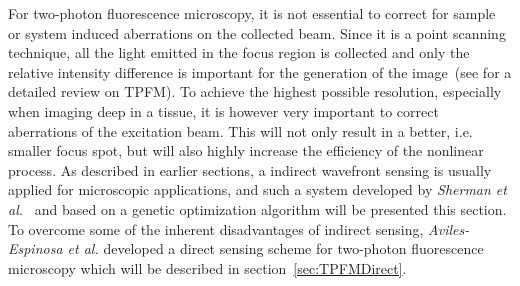 For two-photon fluorescence microscopy, it is not essential to correct for sample or system induced aberrations on the collected beam. Since it is a point scanning technique, all the light emitted in the focus region is collected and only the relative intensity difference is important for the generation of the image~(see \cite{scan_TPFM_review} for a detailed review on TPFM). To achieve the highest possible resolution, especially when imaging deep in a tissue, it is however very important to correct aberrations of the excitation beam. This will not only result in a better, i.e. smaller focus spot, but will also highly increase the efficiency of the nonlinear process. As described in earlier sections, a indirect wavefront sensing is usually applied for microscopic applications, and such a system developed by \emph{Sherman et al.}~\cite{Genetic_MPFM} and based on a genetic optimization algorithm will be presented this section. To overcome some of the inherent disadvantages of indirect sensing, \emph{Aviles-Espinosa et al.} developed a direct sensing scheme for two-photon fluorescence microscopy which will be described in section~\ref{sec:TPFMDirect}.

